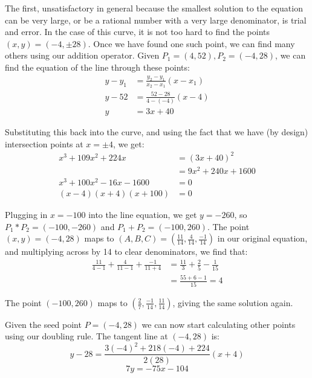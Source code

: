 \documentclass{article}
\begin{document}
The first, unsatisfactory in general because the smallest solution to the equation can be very large, or
be a rational number with a very large denominator, is trial and error. In the case of this curve, it is
not too hard to find the points $(x,y) = (-4,\pm28)$. Once we have found one such point, we can find many
others using our addition operator. Given $P_1 = (4,52), P_2=(-4,28)$, we can find the equation of the
line through these points:
\begin{equation*}
	\begin{split}
		y - y_1 &= \frac{y_2 - y_1}{x_2 - x_1} (x - x_1) \\
		y - 52 &= \frac{52 - 28}{4 - (-4)} (x - 4) \\
		y &= 3x + 40
	\end{split}
\end{equation*}

Substituting this back into the curve, and using the fact that we have (by design) intersection points at
$x=\pm 4$, we get:
\begin{equation*}
        \begin{split}
		x^3 + 109x^2 + 224x &= (3x + 40)^2 \\
                 &= 9x^2 + 240x + 1600 \\
		 x^3 +100 x^2 - 16x - 1600 &= 0 \\
		 (x - 4)(x + 4) (x + 100) &= 0
        \end{split}
\end{equation*}

Plugging in $x = -100$ into the line equation, we get $y = -260$, so $P_1 * P_2 = (-100, -260)$ and
$P_1 + P_2 = (-100, 260)$. The point $(x,y) = (-4,28)$ maps to 
$(A, B, C) = (\frac{11}{14}, \frac{4}{14}, \frac{-1}{14})$ in our original equation, and multiplying across 
by 14 to clear denominators, we find that:
\begin{equation*}
	\begin{split}
		\frac{11}{4 - 1} + \frac{4}{11 - 1} + \frac{-1}{11+4} &= \frac{11}{3} + \frac{2}{5} - \frac{1}{15} \\
		&= \frac{55 + 6 - 1}{15} = 4
	\end{split}
\end{equation*}

The point $(-100, 260)$ maps to $\left(\frac{2}{7},\frac{-1}{14}, \frac{11}{14}\right)$, giving the same solution again.

Given the seed point $P = (-4,28)$ we can now start calculating other points using our doubling rule.
The tangent line at $(-4,28)$ is:
\[ y - 28 = \frac{3(-4)^2+218(-4)+224}{2(28)}(x+4) \]
\[ 7y = -75x - 104 \]
\end{document}
